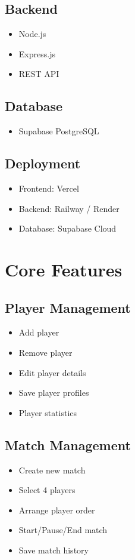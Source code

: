 \documentclass[11pt,a4paper]{article}
\begin{document}
\subsection{Backend}
\begin{itemize}
    \item Node.js
    \item Express.js
    \item REST API
\end{itemize}

\subsection{Database}
\begin{itemize}
    \item Supabase PostgreSQL
\end{itemize}

\subsection{Deployment}
\begin{itemize}
    \item Frontend: Vercel
    \item Backend: Railway / Render
    \item Database: Supabase Cloud
\end{itemize}

\section{Core Features}

\subsection{Player Management}
\begin{itemize}
    \item Add player
    \item Remove player
    \item Edit player details
    \item Save player profiles
    \item Player statistics
\end{itemize}

\subsection{Match Management}
\begin{itemize}
    \item Create new match
    \item Select 4 players
    \item Arrange player order
    \item Start/Pause/End match
    \item Save match history
\end{itemize}
\end{document}
